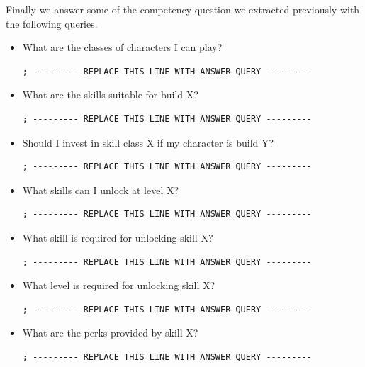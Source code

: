 \documentclass[a4paper,12pt]{report}
\begin{document}
Finally we answer some of the competency question we extracted previously with the following queries.

\begin{itemize}
\item What are the classes of characters I can play?

\begin{lstlisting}
; --------- REPLACE THIS LINE WITH ANSWER QUERY ---------
\end{lstlisting}

\item What are the skills suitable for build X?

\begin{lstlisting}
; --------- REPLACE THIS LINE WITH ANSWER QUERY ---------
\end{lstlisting}

\item Should I invest in skill class X if my character is build Y?

\begin{lstlisting}
; --------- REPLACE THIS LINE WITH ANSWER QUERY ---------
\end{lstlisting}

\item What skills can I unlock at level X?

\begin{lstlisting}
; --------- REPLACE THIS LINE WITH ANSWER QUERY ---------
\end{lstlisting}

\item What skill is required for unlocking skill X?

\begin{lstlisting}
; --------- REPLACE THIS LINE WITH ANSWER QUERY ---------
\end{lstlisting}

\item What level is required for unlocking skill X?

\begin{lstlisting}
; --------- REPLACE THIS LINE WITH ANSWER QUERY ---------
\end{lstlisting}

\item What are the perks provided by skill X?

\begin{lstlisting}
; --------- REPLACE THIS LINE WITH ANSWER QUERY ---------
\end{lstlisting}
\end{itemize}
\end{document}
